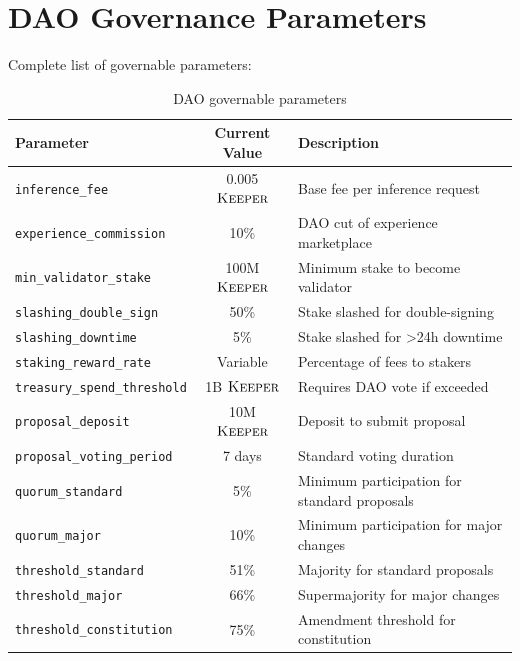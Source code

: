 \section{DAO Governance Parameters}


Complete list of governable parameters:

\begin{table}[h]
\centering
\small
\begin{tabular}{lcp{5cm}}
\toprule
\textbf{Parameter} & \textbf{Current Value} & \textbf{Description} \\
\midrule
\texttt{inference\_fee} & 0.005 $\textsc{Keeper}$ & Base fee per inference request \\
\texttt{experience\_commission} & 10\% & DAO cut of experience marketplace \\
\texttt{min\_validator\_stake} & 100M $\textsc{Keeper}$ & Minimum stake to become validator \\
\texttt{slashing\_double\_sign} & 50\% & Stake slashed for double-signing \\
\texttt{slashing\_downtime} & 5\% & Stake slashed for >24h downtime \\
\texttt{staking\_reward\_rate} & Variable & Percentage of fees to stakers \\
\texttt{treasury\_spend\_threshold} & 1B $\textsc{Keeper}$ & Requires DAO vote if exceeded \\
\texttt{proposal\_deposit} & 10M $\textsc{Keeper}$ & Deposit to submit proposal \\
\texttt{proposal\_voting\_period} & 7 days & Standard voting duration \\
\texttt{quorum\_standard} & 5\% & Minimum participation for standard proposals \\
\texttt{quorum\_major} & 10\% & Minimum participation for major changes \\
\texttt{threshold\_standard} & 51\% & Majority for standard proposals \\
\texttt{threshold\_major} & 66\% & Supermajority for major changes \\
\texttt{threshold\_constitution} & 75\% & Amendment threshold for constitution \\
\bottomrule
\end{tabular}
\caption{DAO governable parameters}
\label{tab:dao_params}
\end{table}

